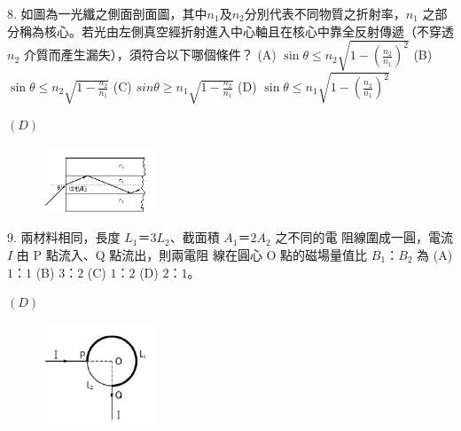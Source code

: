 \documentclass[cn,10pt,math=newtx]{elegantbook}
\begin{document}
\newpage

\begin{example}
   8. 如圖為一光纖之側面剖面圖，其中$n_1$及$n_2$分別代表不同物質之折射率，$n_1$ 之部分稱為核心。若光由左側真空經折射進入中心軸且在核心中靠全反射傳遞（不穿透 $n_2$ 介質而產生漏失），須符合以下哪個條件？
   (A) $\sin{\theta} \le n_2 \sqrt{1-(\frac{n_2}{n_1})^2}$  (B) $\sin{\theta} \le n_2 \sqrt{1-\frac{n_2}{n_1}}$  (C) $sin{\theta} \ge n_1 \sqrt{1-\frac{n_2}{n_1}}$  (D) $\sin{\theta} \le n_1 \sqrt{1-(\frac{n_2}{n_1})^2}$     \\
    \rightline{[全國聯招教甄109]}
\end{example}
\begin{solution}
    $(D)$
\end{solution}
\begin{figure}[htbp]
    \flushright
    \includegraphics[width=0.3\textwidth]{image/109全國8.png}
  \end{figure}
\newpage



\begin{example}
   9. 兩材料相同，長度 $L_1＝3L_2$、截面積 $A_1＝2A_2$ 之不同的電
阻線圍成一圓，電流 $I$ 由 P 點流入、Q 點流出，則兩電阻
線在圓心 O 點的磁場量值比 $B_1：B_2$ 為 (A) $1：1$ (B) $3：2$
(C) $1：2$ (D) $2：1$。\\
    \rightline{[全國聯招教甄109]}
\end{example}
\begin{solution}
    $(D)$
\end{solution}
\begin{figure}[htbp]
    \flushright
    \includegraphics[width=0.3\textwidth]{image/109全國9.png}
  \end{figure}
\newpage
\end{document}
